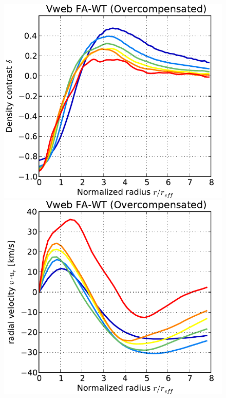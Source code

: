 \documentclass[a4,useAMS,usenatbib,usegraphicx]{latex/mn2e}
\begin{document}
\begin{figure}
  
  \includegraphics[trim = 1mm 0mm 5mm 0mm, clip, keepaspectratio=true,
  width=0.24\textheight]{./figures/voids_density_VwebFAG1.pdf}
  \includegraphics[trim = 1mm 0mm 5mm 0mm, clip, keepaspectratio=true,
  width=0.24\textheight]{./figures/voids_velocity_VwebFAG1.pdf}

\end{figure}
\end{document}
